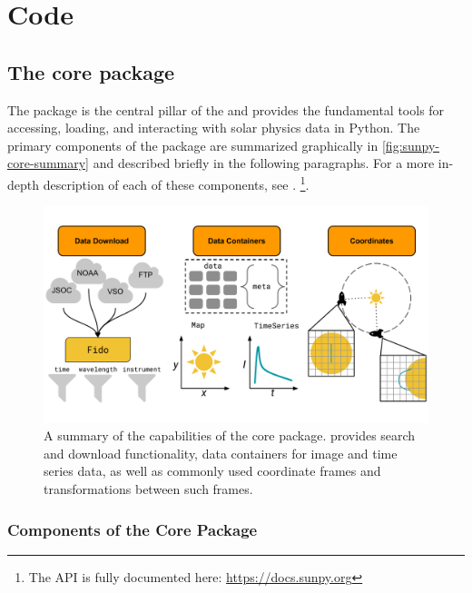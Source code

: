 \section{Code}
\label{sec:code}

\subsection{The \sunpypkg core package}
\label{ssec:the-sunpypkg-core-package}

The \sunpypkg package is the central pillar of the \sunpyproj \citep{sunpy_community2020} and provides the fundamental tools for accessing, loading, and interacting with solar physics data in Python.
The primary components of the \sunpypkg package are summarized graphically in \autoref{fig:sunpy-core-summary} and described briefly in the following paragraphs.
For a more in-depth description of each of these components, see \citet[Section 4]{sunpy_community2020}.
\footnote{The \sunpypkg API is fully documented here: \url{https://docs.sunpy.org}}.

\begin{figure}
    \centering
    \includegraphics[width=\columnwidth]{figures/sunpy-summary-slide.pdf}
    \caption{A summary of the capabilities of the \sunpypkg core package. \sunpypkg provides search and download functionality, data containers for image and time series data, as well as commonly used coordinate frames and transformations between such frames.}
    \label{fig:sunpy-core-summary}
\end{figure}

\subsubsection{Components of the Core Package}
\label{sssec:components-of-the-core-package}

